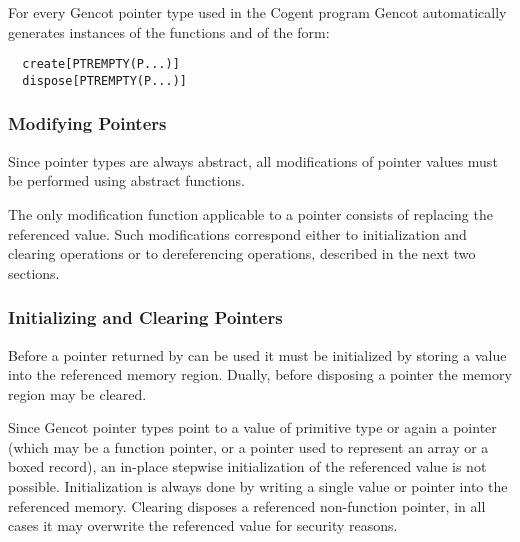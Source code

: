 For every Gencot pointer type  used in the Cogent program Gencot automatically
generates instances of the functions  and  of the form:
\begin{verbatim}
  create[PTREMPTY(P...)]
  dispose[PTREMPTY(P...)]
\end{verbatim}

\subsubsection{Modifying Pointers}

Since pointer types are always abstract, all modifications of pointer values must be performed using abstract functions.

The only modification function applicable to a pointer consists of replacing the referenced value. Such modifications correspond
either to initialization and clearing operations or to dereferencing operations, described in the next two sections.

\subsubsection{Initializing and Clearing Pointers}

Before a pointer returned by  can be used it must be initialized by storing a value into the referenced memory region.
Dually, before disposing a pointer the memory region may be cleared.

Since Gencot pointer types  point to a value of primitive type or again a pointer (which may be a function pointer,
or a pointer used to represent an array or a boxed record), an in-place
stepwise initialization of the referenced value is not possible. Initialization is always done by writing a single value or pointer
into the referenced memory. Clearing disposes a referenced non-function pointer, in all cases it may overwrite the referenced value
for security reasons.

